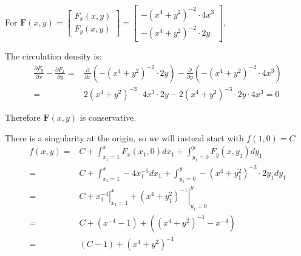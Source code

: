 \documentclass{article}
\newcommand{\colxyvec}[2]{\begin{bmatrix} #1 \\ #2 \end{bmatrix}}
\newcommand{\at}[1]{\left. #1 \right|}
\newcommand{\dr}[1]{\textcolor{dark_red}{#1}}
\begin{document}
\begin{framed}
\dr{For \(\mathbf{F}(x,y) = \colxyvec{F_x(x,y)}{F_y(x,y)} = \colxyvec{-(x^4 + y^2)^{-2} \cdot 4x^3}{-(x^4 + y^2)^{-2} \cdot 2y}\),}

\dr{The circulation density is: 
\begin{align*}
\frac{\partial F_y}{\partial x} - \frac{\partial F_x}{\partial y} = & \frac{\partial}{\partial x}(-(x^4 + y^2)^{-2} \cdot 2y) - \frac{\partial}{\partial y}(-(x^4 + y^2)^{-2} \cdot 4x^3) \\
= & 2(x^4 + y^2)^{-3} \cdot 4x^3 \cdot 2y - 2(x^4 + y^2)^{-3} \cdot 2y \cdot 4x^3 = 0
\end{align*}}

\dr{Therefore \(\mathbf{F}(x,y)\) is conservative.}

\dr{There is a singularity at the origin, so we will instead start with \(f(1,0) = C\)
\begin{align*}
f(x,y) = & C + \int_{x_1 = 1}^x F_x(x_1,0)dx_1 + \int_{y_1 = 0}^y F_y(x,y_1)dy_1 \\
= & C + \int_{x_1 = 1}^x -4x_1^{-5} dx_1 + \int_{y_1 = 0}^y -(x^4 + y_1^2)^{-2} \cdot 2y_1 dy_1 \\
= & C + \at{x_1^{-4}}_{x_1 = 1}^x + \at{(x^4 + y_1^2)^{-1}}_{y_1 = 0}^y \\
= & C + (x^{-4} - 1) + ((x^4 + y^2)^{-1} - x^{-4}) \\
= & (C - 1) + (x^4 + y^2)^{-1}
\end{align*}}

\end{framed}
\end{document}
